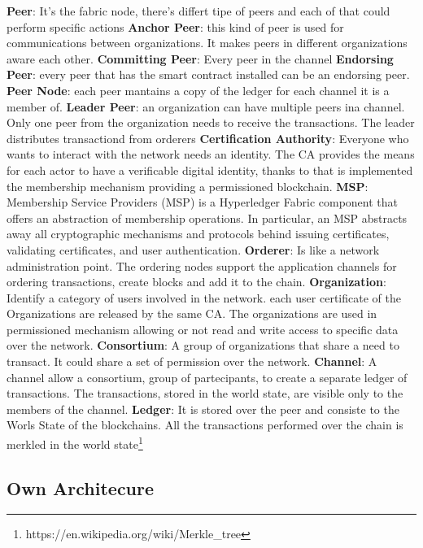 \begin{outline}[enumerate]
    \1 \textbf{Peer}: It's the fabric node, there's differt tipe of peers and each of that could perform
    specific actions
    \2 \textbf{Anchor Peer}: this kind of peer is used for communications between organizations. It makes peers in different organizations aware each other.
    \2 \textbf{Committing Peer}: Every peer in the channel
    \2 \textbf{Endorsing Peer}: every peer that has the smart contract installed can be an endorsing peer.
    \2 \textbf{Peer Node}: each peer mantains a copy of the ledger for each channel it is a member of.
    \2 \textbf{Leader Peer}: an organization can have multiple peers ina channel. Only one peer from the organization needs to receive the transactions. The leader distributes transactiond from orderers    
    \1 \textbf{Certification Authority}: Everyone who wants to interact with the network needs an identity. The CA provides the means for each actor to have a verificable digital identity, thanks to that is implemented the membership mechanism providing a permissioned blockchain. 
    \1 \textbf{MSP}: Membership Service Providers (MSP) is a Hyperledger Fabric component that offers an abstraction of membership operations. In particular, an MSP abstracts away all cryptographic mechanisms and protocols behind issuing certificates, validating certificates, and user authentication.
    \1 \textbf{Orderer}: Is like a network administration point. The ordering nodes support the application channels for ordering transactions, create blocks and add it to the chain.  
    \1 \textbf{Organization}: Identify a category of users involved in the network. each user certificate of the Organizations are released by the same CA. The organizations are used in permissioned mechanism allowing or not read and write access to specific data over the network.
    \1 \textbf{Consortium}: A group of organizations that share a need to transact. It could share a set of permission over the network.
    \1 \textbf{Channel}: A channel allow a consortium, group of partecipants, to create a separate ledger of transactions. The transactions, stored in the world state, are visible only to the members of the channel.
    \1 \textbf{Ledger}: It is stored over the peer and consiste to the Worls State of the blockchains. All the transactions performed over the chain is merkled in the world state\footnote{https://en.wikipedia.org/wiki/Merkle_tree}
\end{outline}


\subsection{Own Architecure}

